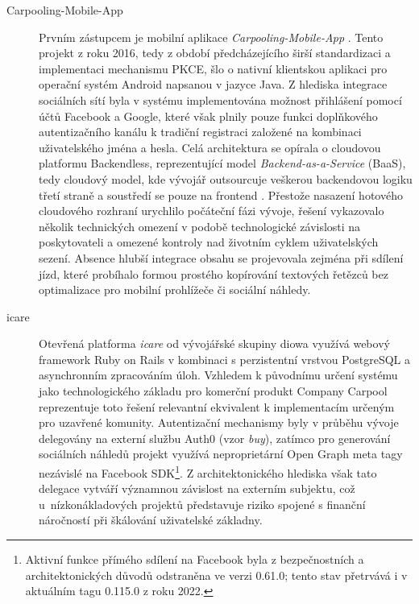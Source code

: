 \documentclass[male,czech,api_bc]{kitheses}
\begin{document}
\begin{description}

\item[Carpooling-Mobile-App] Prvním zástupcem je mobilní aplikace \textit{Carpooling-Mobile-App} \cite{Raut2016}. Tento projekt z roku 2016, tedy z období předcházejícího širší standardizaci a implementaci mechanismu PKCE, šlo o nativní klientskou aplikaci pro operační systém Android napsanou v jazyce Java. Z hlediska integrace sociálních sítí byla v systému implementována možnost přihlášení pomocí účtů Facebook a Google, které však plnily pouze funkci doplňkového autentizačního kanálu k tradiční registraci založené na kombinaci uživatelského jména a hesla. Celá architektura se opírala o cloudovou platformu Backendless, reprezentující model \textit{Backend-as-a-Service} (BaaS), tedy cloudový model, kde vývojář outsourcuje veškerou backendovou logiku třetí straně a soustředí se pouze na frontend \cite{Okanda2024}. Přestože nasazení hotového cloudového rozhraní urychlilo počáteční fázi vývoje, řešení vykazovalo několik technických omezení v podobě technologické závislosti na poskytovateli a omezené kontroly nad životním cyklem uživatelských sezení. Absence hlubší integrace obsahu se projevovala zejména při sdílení jízd, které probíhalo formou prostého kopírování textových řetězců bez optimalizace pro mobilní prohlížeče či sociální náhledy.

\item[icare] Otevřená platforma \textit{icare} od vývojářské skupiny diowa \cite{Icare2025} využívá webový framework Ruby on Rails v kombinaci s perzistentní vrstvou PostgreSQL a asynchronním zpracováním úloh. Vzhledem k původnímu určení systému jako technologického základu pro komerční produkt Company Carpool reprezentuje toto řešení relevantní ekvivalent k implementacím určeným pro uzavřené komunity. Autentizační mechanismy byly v průběhu vývoje delegovány na externí službu Auth0 (vzor \textit{buy}), zatímco pro generování sociálních náhledů projekt využívá neproprietární Open Graph meta tagy nezávislé na Facebook SDK\footnote{Aktivní funkce přímého sdílení na Facebook byla z bezpečnostních a architektonických důvodů odstraněna ve verzi 0.61.0; tento stav přetrvává i v aktuálním tagu 0.115.0 z roku 2022.}. Z architektonického hlediska však tato delegace vytváří významnou závislost na externím subjektu, což u~nízkonákladových projektů představuje riziko spojené s finanční náročností při škálování uživatelské základny.


\end{description}
\end{document}
